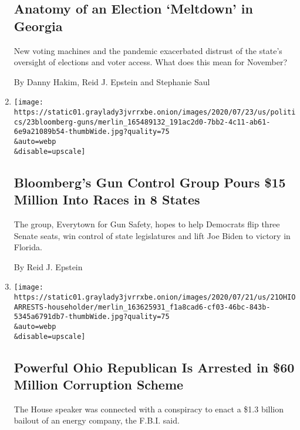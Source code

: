 \begin{enumerate}
  \hypertarget{anatomy-of-an-election-meltdown-in-georgia}{%
  \subsection{Anatomy of an Election `Meltdown' in
  Georgia}\label{anatomy-of-an-election-meltdown-in-georgia}}

  New voting machines and the pandemic exacerbated distrust of the
  state's oversight of elections and voter access. What does this mean
  for November?

  By Danny Hakim, Reid J. Epstein and Stephanie Saul
\item
  \href{/2020/07/23/us/politics/bloomberg-guns.html}{}

  \texttt{[image: https://static01.graylady3jvrrxbe.onion/images/2020/07/23/us/politics/23bloomberg-guns/merlin\_165489132\_191ac2d0-7bb2-4c11-ab61-6e9a21089b54-thumbWide.jpg?quality=75\\\&auto=webp\\\&disable=upscale]}

  \hypertarget{bloombergs-gun-control-group-pours-15-million-into-races-in-8-states}{%
  \subsection{Bloomberg's Gun Control Group Pours \$15 Million Into
  Races in 8
  States}\label{bloombergs-gun-control-group-pours-15-million-into-races-in-8-states}}

  The group, Everytown for Gun Safety, hopes to help Democrats flip
  three Senate seats, win control of state legislatures and lift Joe
  Biden to victory in Florida.

  By Reid J. Epstein
\item
  \href{/2020/07/21/us/larry-householder-ohio-speaker-arrested.html}{}

  \texttt{[image: https://static01.graylady3jvrrxbe.onion/images/2020/07/21/us/21OHIOARRESTS-householder/merlin\_163625931\_f1a8cad6-cf03-46bc-843b-5345a6791db7-thumbWide.jpg?quality=75\\\&auto=webp\\\&disable=upscale]}

  \hypertarget{powerful-ohio-republican-is-arrested-in-60-million-corruption-scheme}{%
  \subsection{Powerful Ohio Republican Is Arrested in \$60 Million
  Corruption
  Scheme}\label{powerful-ohio-republican-is-arrested-in-60-million-corruption-scheme}}

  The House speaker was connected with a conspiracy to enact a \$1.3
  billion bailout of an energy company, the F.B.I. said.


\end{enumerate}
